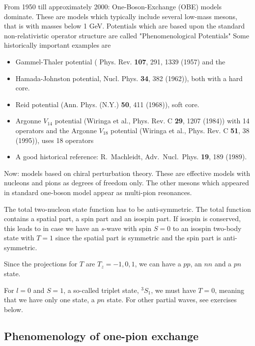 \documentclass[graybox,sectrefs,envcountresetchap,open=right]{svmonodo}
\begin{document}
From 1950 till approximately 2000: One-Boson-Exchange (OBE) models dominate. These are models which typically include several low-mass mesons, that is with masses below 1 GeV.   Potentials which are based upon the standard non-relativistic operator structure
 are called "Phenomenological Potentials" Some historically important examples are   
\begin{itemize}
\item Gammel-Thaler potential ( Phys. Rev. \textbf{107}, 291, 1339 (1957) and the 

\item Hamada-Johnston potential, Nucl. Phys. \textbf{34}, 382 (1962)), both with a hard core.

\item Reid potential (Ann. Phys. (N.Y.) \textbf{50}, 411 (1968)), soft core.

\item Argonne $V_{14}$ potential (Wiringa et al., Phys. Rev. C \textbf{29}, 1207 (1984)) with 14 operators and  the  Argonne $V_{18}$ potential (Wiringa et al., Phys. Rev. C \textbf{51}, 38 (1995)), uses 18 operators

\item A good historical reference: R.~Machleidt, Adv.~Nucl.~Phys.  \textbf{19}, 189 (1989).
\end{itemize}

\noindent
Now: models based on chiral perturbation theory. These are effective models with nucleons and pions as degrees of freedom only. The other mesons which appeared in standard one-boson model appear as multi-pion resonances. 




The total two-nucleon state function has to be anti-symmetric. The total function contains a spatial part, a spin part and an isospin part. If isospin is conserved, this leads to in case we have an $s$-wave with spin $S=0$ to an isospin 
two-body state with $T=1$ since the spatial part is symmetric and the spin part is anti-symmetric. 

Since the projections for $T$ are $T_z=-1,0,1$, we can have a $pp$, an $nn$ and a $pn$ state.

For $l=0$ and $S=1$, a so-called triplet state, $^3S_1$, we must have $T=0$, meaning that we have only one state, a $pn$ state. For other partial waves, see exercises below. 



\subsection{Phenomenology of one-pion exchange}
\end{document}
